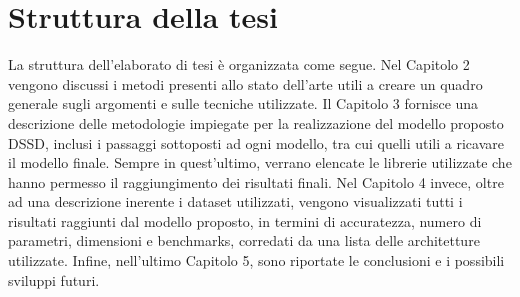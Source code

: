 \section{Struttura della tesi}
La struttura dell'elaborato di tesi è organizzata come segue. Nel Capitolo 2 vengono discussi i metodi presenti allo stato dell'arte utili a creare un quadro generale sugli argomenti e sulle tecniche utilizzate. Il Capitolo 3 fornisce una descrizione delle metodologie impiegate per la realizzazione del modello proposto DSSD, inclusi i passaggi sottoposti ad ogni modello, tra cui quelli utili a ricavare il modello finale. Sempre in quest'ultimo, verrano elencate le librerie utilizzate che hanno permesso il raggiungimento dei risultati finali. Nel Capitolo 4 invece, oltre ad una descrizione inerente i dataset utilizzati, vengono visualizzati tutti i risultati raggiunti dal modello proposto, in termini di accuratezza, numero di parametri, dimensioni e benchmarks, corredati da una lista delle architetture utilizzate. Infine, nell'ultimo Capitolo 5, sono riportate le conclusioni e i possibili sviluppi futuri. 